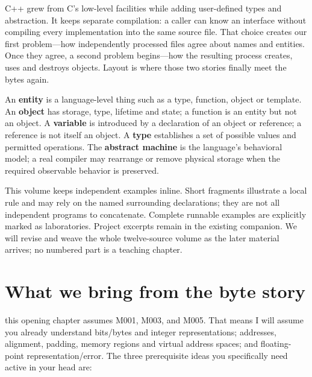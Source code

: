 C++ grew from C's low-level facilities while adding user-defined types and abstraction. It keeps separate compilation: a caller can know an interface without compiling every implementation into the same source file. That choice creates our first problem---how independently processed files agree about names and entities. Once they agree, a second problem begins---how the resulting process creates, uses and destroys objects. Layout is where those two stories finally meet the bytes again.

An \textbf{entity} is a language-level thing such as a type, function, object or template. An \textbf{object} has storage, type, lifetime and state; a function is an entity but not an object. A \textbf{variable} is introduced by a declaration of an object or reference; a reference is not itself an object. A \textbf{type} establishes a set of possible values and permitted operations. The \textbf{abstract machine} is the language's behavioral model; a real compiler may rearrange or remove physical storage when the required observable behavior is preserved.

This volume keeps independent examples inline. Short  fragments illustrate a local rule and may rely on the named surrounding declarations; they are not all independent programs to concatenate. Complete runnable examples are explicitly marked as laboratories. Project excerpts remain in the existing companion. We will revise and weave the whole twelve-source volume as the later material arrives; no numbered part is a teaching chapter.

\section{What we bring from the byte story}\label{05-engine-i-ch002-what-we-bring-from-the-byte-story}

\hypertarget{05-engine-i-ch002-what-we-bring-from-the-byte-story}{}

this opening chapter assumes M001, M003, and M005. That means I will assume you already understand bits/bytes and integer representations; addresses, alignment, padding, memory regions and virtual address spaces; and floating-point representation/error. The three prerequisite ideas you specifically need active in your head are:

